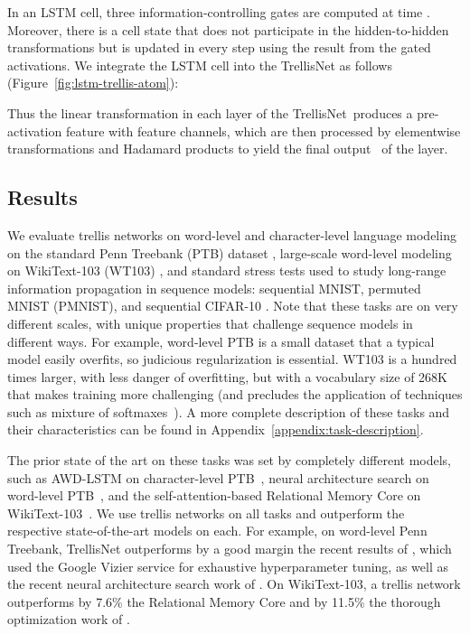 \documentclass{article} \usepackage{iclr2019_conference,times}
\newcommand{\model}{TrellisNet}
\begin{document}
In an LSTM cell, three information-controlling gates are computed at time . Moreover, there is a cell state that does not participate in the hidden-to-hidden transformations but is updated in every step using the result from the gated activations. We integrate the LSTM cell into the TrellisNet as follows (Figure~\ref{fig:lstm-trellis-atom}):

Thus the linear transformation in each layer of the \model~produces a pre-activation feature  with  feature channels, which are then processed by elementwise transformations and Hadamard products to yield the final output \small\normalsize~of the layer.
\subsection{Results}

We evaluate trellis networks on word-level and character-level language modeling on the standard Penn Treebank (PTB) dataset \citep{Marcus93buildinga,Mikolov2010PTB}, large-scale word-level modeling on WikiText-103 (WT103) \citep{merity2016pointer}, and standard stress tests used to study long-range information propagation in sequence models: sequential MNIST, permuted MNIST (PMNIST), and sequential CIFAR-10 \citep{chang2017dilated,bai2018empirical,trinh2018learning}. Note that these tasks are on very different scales, with unique properties that challenge sequence models in different ways. For example, word-level PTB is a small dataset that a typical model easily overfits, so judicious regularization is essential. WT103 is a hundred times larger, with less danger of overfitting, but with a vocabulary size of 268K that makes training more challenging (and precludes the application of techniques such as mixture of softmaxes~\citep{yang2018breaking}). A more complete description of these tasks and their characteristics can be found in Appendix~\ref{appendix:task-description}.

The prior state of the art on these tasks was set by completely different models, such as AWD-LSTM on character-level PTB~\citep{merity2018analysis}, neural architecture search on word-level PTB~\citep{pham2018efficient}, and the self-attention-based Relational Memory Core on \mbox{WikiText-103}~\citep{santoro2018relational}. We use trellis networks on all tasks and outperform the respective state-of-the-art models on each. For example, on word-level Penn Treebank, TrellisNet outperforms by a good margin the recent results of \cite{Melis2018}, which used the Google Vizier service for exhaustive hyperparameter tuning, as well as the recent neural architecture search work of \cite{pham2018efficient}. On WikiText-103, a trellis network outperforms by 7.6\% the Relational Memory Core \citep{santoro2018relational} and by 11.5\% the thorough optimization work of \cite{merity2018analysis}.
\end{document}
